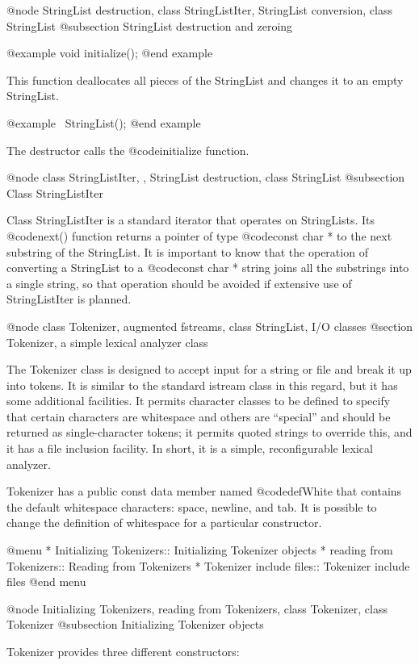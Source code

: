 @node StringList destruction, class StringListIter, StringList conversion, class StringList
@subsection StringList destruction and zeroing

@example
void initialize();
@end example

This function deallocates all pieces of the StringList and changes
it to an empty StringList.

@example
~StringList();
@end example

The destructor calls the @code{initialize} function.

@node class StringListIter,  , StringList destruction, class StringList
@subsection Class StringListIter

Class StringListIter is a standard iterator that operates on
StringLists.  Its @code{next()} function returns a pointer of type
@code{const char *} to the next substring of the StringList.
It is important to know that the operation of converting a
StringList to a @code{const char *} string joins all the substrings into
a single string, so that operation should be avoided if extensive
use of StringListIter is planned.

@node class Tokenizer, augmented fstreams, class StringList, I/O classes
@section Tokenizer, a simple lexical analyzer class

The Tokenizer class is designed to accept input for a string or file
and break it up into tokens.  It is similar to the standard istream
class in this regard, but it has some additional facilities.  It
permits character classes to be defined to specify that certain
characters are whitespace and others are ``special'' and should be
returned as single-character tokens; it permits quoted strings to
override this, and it has a file inclusion facility.  In short, it
is a simple, reconfigurable lexical analyzer.


Tokenizer has a public const data member named @code{defWhite}
that contains the default whitespace characters: space, newline,
and tab.  It is possible to change the definition of whitespace
for a particular constructor.

@menu
* Initializing Tokenizers::     Initializing Tokenizer objects
* reading from Tokenizers::     Reading from Tokenizers
* Tokenizer include files::     Tokenizer include files
@end menu

@node Initializing Tokenizers, reading from Tokenizers, class Tokenizer, class Tokenizer
@subsection Initializing Tokenizer objects

Tokenizer provides three different constructors:

